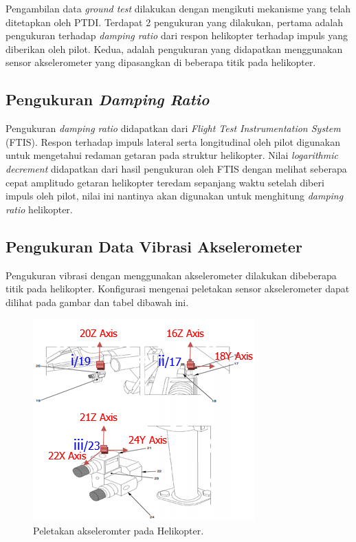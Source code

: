 Pengambilan data \textit{ground test} dilakukan dengan mengikuti mekanisme yang telah ditetapkan oleh PTDI. Terdapat 2 pengukuran yang dilakukan, pertama adalah pengukuran terhadap \textit{damping ratio} dari respon helikopter terhadap impuls yang diberikan oleh pilot. Kedua, adalah pengukuran yang didapatkan menggunakan sensor akselerometer yang dipasangkan di beberapa titik pada helikopter.

\subsection{Pengukuran \textit{Damping Ratio}}
Pengukuran \textit{damping ratio} didapatkan dari \textit{Flight Test Instrumentation System} (FTIS). Respon terhadap impuls lateral serta longitudinal oleh pilot digunakan untuk mengetahui redaman getaran pada struktur helikopter. Nilai \textit{logarithmic decrement} didapatkan dari hasil pengukuran oleh FTIS dengan melihat seberapa cepat amplitudo getaran helikopter teredam sepanjang waktu setelah diberi impuls oleh pilot, nilai ini nantinya akan digunakan untuk menghitung \textit{damping ratio} helikopter.

\subsection{Pengukuran Data Vibrasi Akselerometer}
Pengukuran vibrasi dengan menggunakan akselerometer dilakukan dibeberapa titik pada helikopter. Konfigurasi mengenai peletakan sensor akselerometer dapat dilihat pada gambar dan tabel dibawah ini.

\begin{figure}[H]
	\centering
	\includegraphics[width=0.53\linewidth]{gambar/peletakan_sensor.png}
	\caption{Peletakan akseleromter pada Helikopter.}
	\label{peletakan_sensor.png}
\end{figure}


